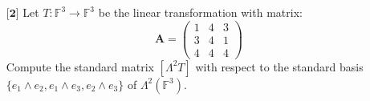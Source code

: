 \documentclass[12pt]{article}
\DeclarePairedDelimiter\set\{\}
\begin{document}
\begin{itemize}
\begin{itemize}
\begin{proof}
        Now take any function $\pi$ from Hom$(V,W)$. We can define it its values when inputting the basis of $V$ as $\pi(v_i)\in W$. Meaning when $i \in {1,2,\dots, n}$ and $\alpha_{ij}$ as a scalar, we can express $\pi(v_i)$ as,
        \begin{align*}
            \pi(v_i) = \sum_{j}^m \alpha_{ij}w_j
        \end{align*} 
        Which means,
        \begin{align*}
            \pi = \sum_{i,j}^{n,m} \alpha_{ij}\pi_{ij}
        \end{align*}
        because the linear functions agree on basis vectors. This means for $1 \leq i \leq n$ and $1 \leq j \leq m$,
        \[\text{Hom}(V,W) = \text{span}(\set{\pi_{ij}})\]

        This is the proof since we know there are $\text{dim}(V)\text{dim}(W)$ of these functions. 

    \end{proof}
    
    \vspace{.3cm}
    \item[(b)]
    Show that $\text{Hom}(V,V) \cong V \otimes V^*$.
    
    \end{itemize}
    
    \vspace{.5cm}
    \item[$\textbf{[2]}$]
    Let $T: \mathbb{F}^3 \rightarrow \mathbb{F}^3$ be the linear transformation with matrix:
    \begin{equation*}
    \mathbf{A} = \begin{pmatrix}
    1 & 4 & 3 \\
    3 & 4 & 1 \\
    4 & 4 & 4
    \end{pmatrix}
    \end{equation*}
    Compute the standard matrix $[\Lambda^2 T]$ with respect to the standard basis $\{e_1 \wedge e_2, e_1 \wedge e_3, e_2 \wedge e_3\}$ of $\Lambda^2(\mathbb{F}^3)$. 


\end{itemize}
\end{document}

